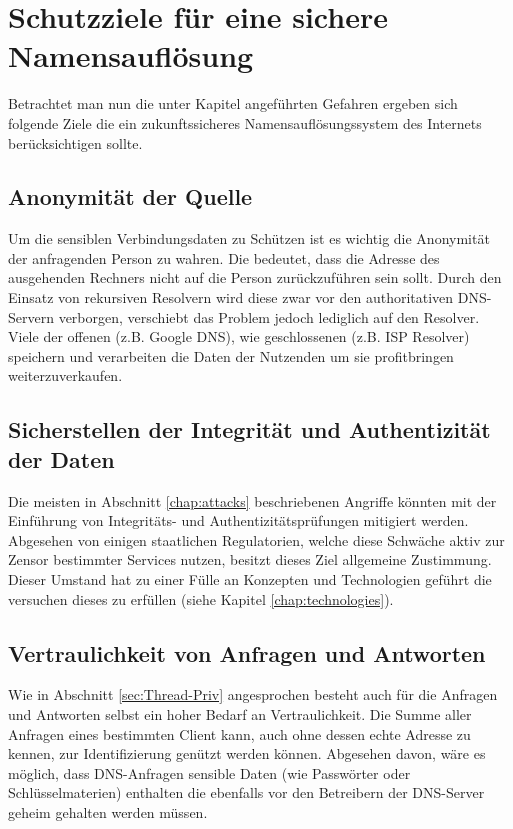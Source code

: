 \chapter{Schutzziele für eine sichere Namensauflösung}
\label{chap:goals}

Betrachtet man nun die unter Kapitel \label{cap:threads} angeführten Gefahren ergeben sich folgende Ziele die ein zukunftssicheres Namensauflösungssystem des Internets berücksichtigen sollte\cite{Grothoff2018}. 

\section{Anonymität der Quelle}
\label{sec:goals-sourceanon}
Um die sensiblen Verbindungsdaten zu Schützen ist es wichtig die Anonymität der anfragenden Person zu wahren. Die bedeutet, dass die Adresse des ausgehenden Rechners nicht auf die Person zurückzuführen sein sollt. Durch den Einsatz von rekursiven Resolvern wird diese zwar vor den authoritativen DNS-Servern verborgen, verschiebt das Problem jedoch lediglich auf den Resolver. Viele der offenen (z.B. Google DNS), wie geschlossenen (z.B. ISP Resolver) speichern und verarbeiten die Daten der Nutzenden um sie profitbringen weiterzuverkaufen.

\section{Sicherstellen der Integrität und Authentizität der Daten}
\label{sec:goals-recordsecurity}
Die meisten in Abschnitt \ref{chap:attacks} beschriebenen Angriffe könnten mit der Einführung von Integritäts- und Authentizitätsprüfungen mitigiert werden. Abgesehen von einigen staatlichen Regulatorien, welche diese Schwäche aktiv zur Zensor bestimmter Services nutzen, besitzt dieses Ziel allgemeine Zustimmung. Dieser Umstand hat zu einer Fülle an Konzepten und Technologien geführt die versuchen dieses zu erfüllen (siehe Kapitel \ref{chap:technologies}). 

\section{Vertraulichkeit von Anfragen und Antworten}
\label{sec:goals-requestsecurity}
Wie in Abschnitt \ref{sec:Thread-Priv} angesprochen besteht auch für die Anfragen und Antworten selbst ein hoher Bedarf an Vertraulichkeit. Die Summe aller Anfragen eines bestimmten Client kann, auch ohne dessen echte Adresse zu kennen, zur Identifizierung genützt werden können. Abgesehen davon, wäre es möglich, dass DNS-Anfragen sensible Daten (wie Passwörter oder Schlüsselmaterien) enthalten die ebenfalls vor den Betreibern der DNS-Server geheim gehalten werden müssen.

